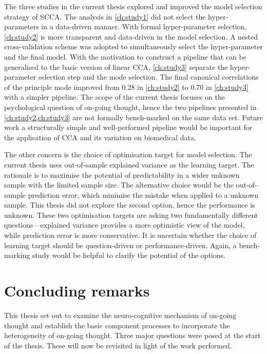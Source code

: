 The three studies in the current thesis explored and improved the model selection strategy of SCCA. The analysis in \cref{ch:study1} did not select the hyper-parameters in a data-driven manner. With formal hyper-parameter selection, \cref{ch:study2} is more transparent and data-driven in the model selection. A nested cross-validation scheme was adopted to simultaneously select the hyper-parameter and the final model. With the motivation to construct a pipeline that can be generalised to the basic version of linear CCA, \cref{ch:study3} separate the hyper-parameter selection step and the mode selection. The final canonical correlations of the principle mode improved from 0.28 in \cref{ch:study2} to 0.70 in \cref{ch:study3} with a simpler pipeline. The scope of the current thesis focuses on the psychological question of on-going thought, hence the two pipelines presented in \cref{ch:study2,ch:study3} are not formally bench-marked on the same data set. Future work a structurally simple and well-performed pipeline would be important for the application of CCA and its variation on biomedical data.

The other concern is the choice of optimisation target for model selection. The current thesis uses out-of-sample explained variance as the learning target. The rationale is to maximise the potential of predictability in a wider unknown sample with the limited sample size. The alternative choice would be the out-of-sample prediction error, which minimise the mistake when applied to a unknown sample. This thesis did not explore the second option, hence the performance is unknown. These two optimisation targets are asking two fundamentally different questions---explained variance provides a more optimistic view of the model, while prediction error is more conservative. It is uncertain whether the choice of learning target should be question-driven or performance-driven. Again, a bench-marking study would be helpful to clarify the potential of the options. 


\section{Concluding remarks}
\label{ch:discussion:summary}

This thesis set out to examine the neuro-cognitive mechanism of on-going thought and establish the basic component processes to incorporate the heterogeneity of on-going thought. Three major questions were posed at the start of the thesis. These will now be revisited in light of the work performed.

